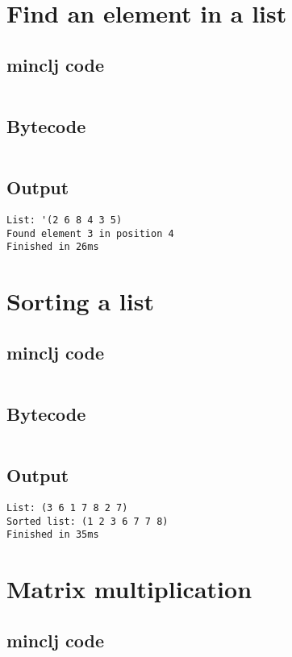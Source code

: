 \documentclass[11pt]{scrreprt}
\begin{document}
\section{Find an element in a list}
\subsection{minclj code}
\inputminted{clojure}{/home/mario/git/MarioJim/miniclj/examples/find_in_list.clj}

\subsection{Bytecode}
\inputminted{text}{/home/mario/git/MarioJim/miniclj/examples/find_in_list.mclj}

\subsection{Output}
\begin{verbatim}
List: '(2 6 8 4 3 5)
Found element 3 in position 4
Finished in 26ms
\end{verbatim}

\section{Sorting a list}
\subsection{minclj code}
\inputminted{clojure}{/home/mario/git/MarioJim/miniclj/examples/sort_list.clj}

\subsection{Bytecode}
\inputminted{text}{/home/mario/git/MarioJim/miniclj/examples/sort_list.mclj}

\subsection{Output}
\begin{verbatim}
List: (3 6 1 7 8 2 7)
Sorted list: (1 2 3 6 7 7 8)
Finished in 35ms
\end{verbatim}

\section{Matrix multiplication}
\subsection{minclj code}
\inputminted{clojure}{/home/mario/git/MarioJim/miniclj/examples/matrix_multiplication.clj}
\end{document}
